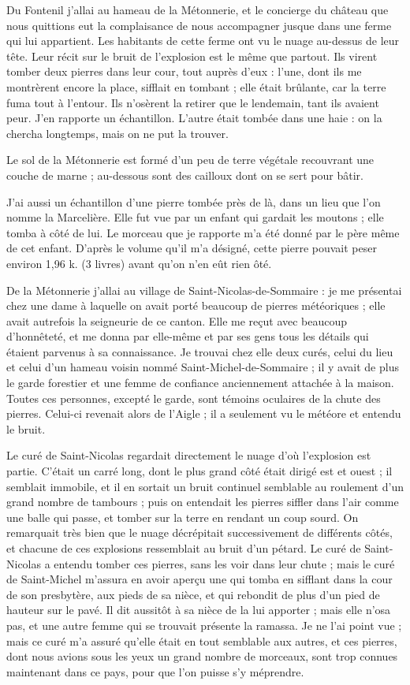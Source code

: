 \documentclass[a4paper, 11pt, oneside, polutonikogreek, french]{article}
\begin{document}
Du Fontenil j'allai au hameau de la Métonnerie, et le concierge du château que nous quittions eut la complaisance de nous accompagner jusque dans une ferme qui lui appartient. Les habitants de cette ferme ont vu le nuage au-dessus de leur tête. Leur récit sur le bruit de l'explosion est le même que partout. Ils virent tomber deux pierres dans leur cour, tout auprès d'eux : l'une, dont ils me montrèrent encore la place, sifflait en tombant ; elle était brûlante, car la terre fuma tout à l'entour. Ils n'osèrent la retirer que le lendemain, tant ils avaient peur. J'en rapporte un échantillon. L'autre était tombée dans une haie : on la chercha longtemps, mais on ne put la trouver.

Le sol de la Métonnerie est formé d'un peu de terre végétale recouvrant une couche de marne ; au-dessous sont des cailloux dont on se sert pour bâtir.

J'ai aussi un échantillon d'une pierre tombée près de là, dans un lieu que l'on nomme la Marcelière. Elle fut vue par un enfant qui gardait les moutons ; elle tomba à côté de lui. Le morceau que je rapporte m'a été donné par le père même de cet enfant. D'après le volume qu'il m'a désigné, cette pierre pouvait peser environ 1,96 k. (3 livres) avant qu'on n'en eût rien ôté.

De la Métonnerie j'allai au village de Saint-Nicolas-de-Sommaire : je me présentai chez une dame à laquelle on avait porté beaucoup de pierres météoriques ; elle avait autrefois la seigneurie de ce canton. Elle me reçut avec beaucoup d'honnêteté, et me donna par elle-même et par ses gens tous les détails qui étaient parvenus à sa connaissance. Je trouvai chez elle deux curés, celui du lieu et celui d'un hameau voisin nommé Saint-Michel-de-Sommaire ; il y avait de plus le garde forestier et une femme de confiance anciennement attachée à la maison. Toutes ces personnes, excepté le garde, sont témoins oculaires de la chute des pierres. Celui-ci revenait alors de l'Aigle ; il a seulement vu le météore et entendu le bruit.

Le curé de Saint-Nicolas regardait directement le nuage d'où l'explosion est partie. C'était un carré long, dont le plus grand côté était dirigé est et ouest ; il semblait immobile, et il en sortait un bruit continuel semblable au roulement d'un grand nombre de tambours ; puis on entendait les pierres siffler dans l'air comme une balle qui passe, et tomber sur la terre en rendant un coup sourd. On remarquait très bien que le nuage décrépitait successivement de différents côtés, et chacune de ces explosions ressemblait au bruit d'un pétard. Le curé de Saint-Nicolas a entendu tomber ces pierres, sans les voir dans leur chute ; mais le curé de Saint-Michel m'assura en avoir aperçu une qui tomba en sifflant dans la cour de son presbytère, aux pieds de sa nièce, et qui rebondit de plus d'un pied de hauteur sur le pavé. Il dit aussitôt à sa nièce de la lui apporter ; mais elle n'osa pas, et une autre femme qui se trouvait présente la ramassa. Je ne l'ai point vue ; mais ce curé m'a assuré qu'elle était en tout semblable aux autres, et ces pierres, dont nous avions sous les yeux un grand nombre de morceaux, sont trop connues maintenant dans ce pays, pour que l'on puisse s'y méprendre.
\end{document}
